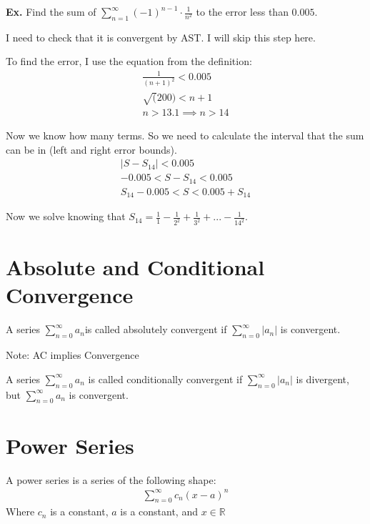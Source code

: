 \documentclass[12pt,letterpaper]{article} \usepackage{amsmath} \usepackage{graphicx}  \usepackage{longtable}  \usepackage{amssymb}
\begin{document}
        \begin{mdframed}
            \textbf{Ex. } Find the sum of $\sum^{\infty}_{n=1} (-1)^{n-1} \cdot \frac{1}{n^2}$ to the error less than $0.005$.

            I need to check that it is convergent by AST. I will skip this step here. 

            To find the error, I use the equation from the definition:
            \begin{align*}
                \frac{1}{(n+1)^2} < 0.005\\
                \sqrt(200) < n+1\\
                n > 13.1 \implies n > 14
            \end{align*}

            Now we know how many terms. So we need to calculate the interval that the sum can be in (left and right error bounds).
            \begin{align*}
                |S-S_{14}| < 0.005\\
                -0.005 < S-S_{14} < 0.005\\
                S_{14} - 0.005 < S < 0.005 + S_{14} 
            \end{align*}

            Now we solve knowing that $S_{14} = \frac{1}{1} - \frac{1}{2^2} + \frac{1}{3^2} + ... - \frac{1}{14^2}$.
        \end{mdframed}

    \section{Absolute and Conditional Convergence}
    A series $\sum^{\infty}_{n=0}a_n$is called absolutely convergent if $\sum^{\infty}_{n=0}|a_n|$ is convergent.

    Note: AC implies Convergence

    A series $\sum^{\infty}_{n=0}a_n$ is called conditionally convergent if $\sum^{\infty}_{n=0}|a_n|$ is divergent, but $\sum^{\infty}_{n=0}a_n$ is convergent. 
    
    \section{Power Series}
    A power series is a series of the following shape:
    \begin{align*}
        \sum^{\infty}_{n=0} c_n (x-a)^n
    \end{align*}
    Where $c_n$ is a constant, $a$ is a constant, and $x\in \mathbb{R}$
\end{document}
